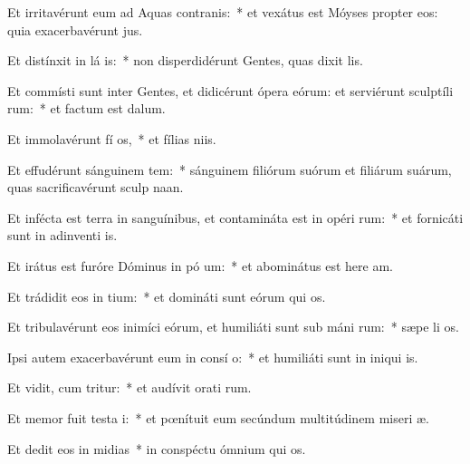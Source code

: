 \item Et irritavérunt eum ad Aquas contranis:~* et vexátus est Móyses propter eos: quia exacerbavérunt  jus.
\item Et distínxit in lá is:~* non disperdidérunt Gentes, quas dixit  lis.
\item Et commísti sunt inter Gentes, et didicérunt ópera eórum: et serviérunt sculptíli rum:~* et factum est   dalum.
\item Et immolavérunt fí os,~* et fílias  niis.
\item Et effudérunt sánguinem tem:~* sánguinem filiórum suórum et filiárum suárum, quas sacrificavérunt sculp naan.
\item Et infécta est terra in sanguínibus, et contamináta est in opéri rum:~* et fornicáti sunt in adinventi is.
\item Et irátus est furóre Dóminus in pó um:~* et abominátus est here am.
\item Et trádidit eos in  tium:~* et domináti sunt eórum qui  os.
\item Et tribulavérunt eos inimíci eórum, et humiliáti sunt sub máni rum:~* sæpe li os.
\item Ipsi autem exacerbavérunt eum in consí o:~* et humiliáti sunt in iniqui is.
\item Et vidit, cum tritur:~* et audívit orati rum.
\item Et memor fuit testa i:~* et pœnítuit eum secúndum multitúdinem miseri æ.
\item Et dedit eos in midias~* in conspéctu ómnium qui  os.
